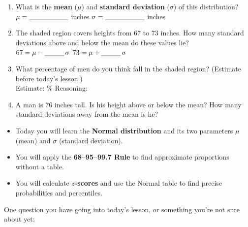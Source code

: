 \documentclass[10pt]{article}
\begin{document}
\begin{enumerate}[leftmargin=1.5em, itemsep=10pt]

  \item What is the \textbf{mean} ($\mu$) and \textbf{standard deviation} ($\sigma$)
        of this distribution?\\[6pt]
        $\mu = \blank{2cm}$ inches \qquad $\sigma = \blank{2cm}$ inches

  \item The shaded region covers heights from 67 to 73 inches.
        How many standard deviations above and below the mean do these values lie?\\[6pt]
        $67 = \mu - \blank{1cm}\,\sigma$ \qquad $73 = \mu + \blank{1cm}\,\sigma$

  \item What percentage of men do you think fall in the shaded region?
        (Estimate before today's lesson.)\\[6pt]
        Estimate: \blank{3cm}\% \quad Reasoning: \blank{8cm}

  \item A man is 76 inches tall. Is his height above or below the mean?
        How many standard deviations away from the mean is he?\\[6pt]
        \writeline

\end{enumerate}

\vspace{0.14in}

\begin{tcolorbox}[colback=greenbg, colframe=greenacc, boxrule=0.8pt, arc=2mm,
    left=4mm, right=4mm, top=3mm, bottom=3mm]
\small
\begin{itemize}[leftmargin=1.3em, itemsep=5pt]
  \item Today you will learn the \textbf{Normal distribution} and its two parameters
        $\mu$ (mean) and $\sigma$ (standard deviation).
  \item You will apply the \textbf{68--95--99.7 Rule} to find approximate proportions
        without a table.
  \item You will calculate \textbf{$z$-scores} and use the Normal table to find
        precise probabilities and percentiles.
\end{itemize}
\end{tcolorbox}

\vspace{0.12in}

\noindent\textcolor{slate}{\small One question you have going into today's lesson,
or something you're not sure about yet:}\\[8pt]
\writeline
\end{document}
